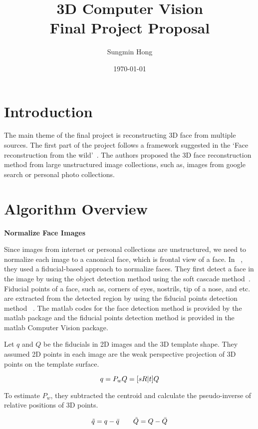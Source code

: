 \documentclass[10pt]{article}
\title{3D Computer Vision \\ Final Project Proposal}
\author{Sungmin Hong}
\date{\today}
\begin{document}
\maketitle

\section{Introduction}

The main theme of the final project is reconstructing 3D face from multiple sources. 
The first part of the project follows a framework suggested in the `Face reconstruction from the wild'~\cite{Kemel2011}.
The authors proposed the 3D face reconstruction method from large unstructured image collections, such as, images from google search or personal photo collections. 

\section{Algorithm Overview}

\noindent \textbf{Normalize Face Images \\} 

Since images from internet or personal collections are unstructured, we need to normalize each image to a canonical face, which is frontal view of a face.
In ~\cite{Kemel2011}, they used a fiducial-based approach to normalize faces. They first detect a face in the image by using the object detection method using the soft cascade method~\cite{Bourdev05}.
Fiducial points of a face, such as, corners of eyes, nostrils, tip of a nose, and etc. are extracted from the detected region by using the fiducial points detection method ~\cite{Everingham06}. 
The matlab codes for the face detection method is provided by the matlab package and the fiducial points detection method is provided in the matlab Computer Vision package. 

Let $q$ and $Q$ be the fiducials in 2D images and the 3D template shape. 
They assumed 2D points in each image are the weak perspective projection of 3D points on the template surface. 

\begin{equation}
    q = P_wQ = [ sR | t ]Q \\    
\label{eq1_1}
\end{equation}

To estimate $P_w$, they subtracted the centroid and calculate the pseudo-inverse of relative positions of 3D points.

\begin{equation}
 \tilde{q} = q - \bar{q} \qquad \tilde{Q} = Q - \bar{Q} \\
\end{equation}
\end{document}
